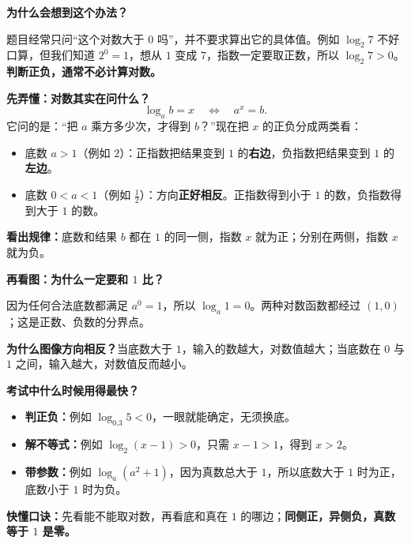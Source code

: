 \begin{explanationbox}
  \textbf{\textcolor{CExplanation}{为什么会想到这个办法？}}

  题目经常只问“这个对数大于 $0$ 吗”，并不要求算出它的具体值。例如 $\log_2 7$ 不好口算，但我们知道 $2^0=1$，想从 $1$ 变成 $7$，指数一定要取正数，所以 $\log_2 7>0$。\textbf{判断正负，通常不必计算对数。}

  \medskip
  \textbf{\textcolor{CExplanation}{先弄懂：对数其实在问什么？}}
  \[
    \log_a b=x\quad\Longleftrightarrow\quad a^x=b.
  \]
  它问的是：“把 $a$ 乘方多少次，才得到 $b$？”现在把 $x$ 的正负分成两类看：
  \begin{itemize}[leftmargin=*,itemsep=0.25em,topsep=0.25em]
    \item 底数 $a>1$（例如 $2$）：正指数把结果变到 $1$ 的\textbf{右边}，负指数把结果变到 $1$ 的\textbf{左边}。
    \item 底数 $0<a<1$（例如 $\frac12$）：方向\textbf{正好相反}。正指数得到小于 $1$ 的数，负指数得到大于 $1$ 的数。
  \end{itemize}
  \begin{center}
  
  \end{center}
  \textbf{看出规律：}底数和结果 $b$ 都在 $1$ 的同一侧，指数 $x$ 就为正；分别在两侧，指数 $x$ 就为负。

  \medskip
  \textbf{\textcolor{CExplanation}{再看图：为什么一定要和 $1$ 比？}}

  因为任何合法底数都满足 $a^0=1$，所以 $\log_a1=0$。两种对数函数都经过 $(1,0)$；这是正数、负数的分界点。
  \begin{center}
  
  \end{center}
  \textbf{为什么图像方向相反？}当底数大于 $1$，输入的数越大，对数值越大；当底数在 $0$ 与 $1$ 之间，输入越大，对数值反而越小。

  \medskip
  \textbf{\textcolor{CExplanation}{考试中什么时候用得最快？}}
  \begin{itemize}[leftmargin=*,itemsep=0.25em,topsep=0.25em]
    \item \textbf{判正负：}例如 $\log_{0.3}5<0$，一眼就能确定，无须换底。
    \item \textbf{解不等式：}例如 $\log_2(x-1)>0$，只需 $x-1>1$，得到 $x>2$。
    \item \textbf{带参数：}例如 $\log_a(a^2+1)$，因为真数总大于 $1$，所以底数大于 $1$ 时为正，底数小于 $1$ 时为负。
  \end{itemize}
  \textbf{\textcolor{CExplanation}{快懂口诀：}}先看能不能取对数，再看底和真在 $1$ 的哪边；\textbf{同侧正，异侧负，真数等于 $1$ 是零。}
\end{explanationbox}
